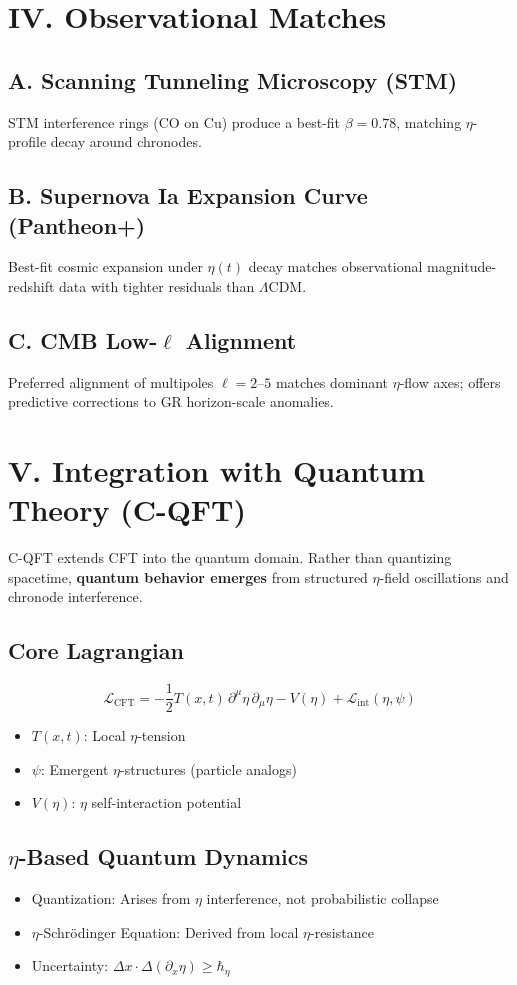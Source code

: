 \documentclass[12pt]{article}
\begin{document}
\section*{IV. Observational Matches}
\subsection*{A. Scanning Tunneling Microscopy (STM)}
STM interference rings (CO on Cu) produce a best-fit $\beta = 0.78$, matching $\eta$-profile decay around chronodes.

\subsection*{B. Supernova Ia Expansion Curve (Pantheon+)}
Best-fit cosmic expansion under $\eta(t)$ decay matches observational magnitude-redshift data with tighter residuals than $\Lambda$CDM.

\subsection*{C. CMB Low-$\ell$ Alignment}
Preferred alignment of multipoles $\ell = 2$--$5$ matches dominant $\eta$-flow axes; offers predictive corrections to GR horizon-scale anomalies.

\section*{V. Integration with Quantum Theory (C-QFT)}
C-QFT extends CFT into the quantum domain. Rather than quantizing spacetime, \textbf{quantum behavior emerges} from structured $\eta$-field oscillations and chronode interference.

\subsection*{Core Lagrangian}
\[
\mathcal{L}_\text{CFT} = -\frac{1}{2} T(x,t) \, \partial^\mu \eta \, \partial_\mu \eta - V(\eta) + \mathcal{L}_\text{int}(\eta, \psi)
\]

\begin{itemize}
  \item $T(x,t)$: Local $\eta$-tension
  \item $\psi$: Emergent $\eta$-structures (particle analogs)
  \item $V(\eta)$: $\eta$ self-interaction potential
\end{itemize}

\subsection*{$\eta$-Based Quantum Dynamics}
\begin{itemize}
  \item Quantization: Arises from $\eta$ interference, not probabilistic collapse
  \item $\eta$-Schrödinger Equation: Derived from local $\eta$-resistance
  \item Uncertainty: $\Delta x \cdot \Delta(\partial_x \eta) \geq \hbar_\eta$
\end{itemize}
\end{document}
